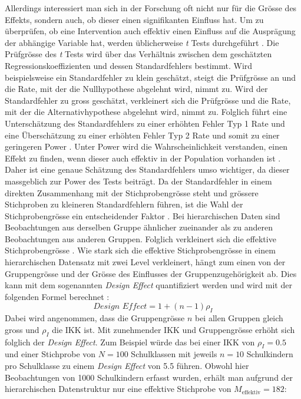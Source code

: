 \documentclass[12pt, a4paper]{article}\usepackage[]{graphicx}\usepackage[]{color}
\begin{document}
Allerdings interessiert man sich in der Forschung oft nicht nur für die Grösse des Effekts, sondern auch, ob dieser einen signifikanten Einfluss hat. Um zu überprüfen, ob eine Intervention auch effektiv einen Einfluss auf die Ausprägung der abhängige Variable hat, werden üblicherweise \textit{t} Tests durchgeführt \citep{SnijdersTomA.B2012Ma:a}. Die Prüfgrösse des \textit{t} Tests wird über das Verhältnis zwischen dem geschätzten Regressionskoeffizienten und dessen Standardfehlers bestimmt. Wird beispielsweise ein Standardfehler zu klein geschätzt, steigt die Prüfgrösse an und die Rate, mit der die Nullhypothese abgelehnt wird, nimmt zu. Wird der Standardfehler zu gross geschätzt, verkleinert sich die Prüfgrösse und die Rate, mit der die Alternativhypothese abgelehnt wird, nimmt zu. Folglich führt eine Unterschätzung des Standardfehlers zu einer erhöhten Fehler Typ 1 Rate und eine Überschätzung zu einer erhöhten Fehler Typ 2 Rate und somit zu einer geringeren Power \citep{SnijdersTomA.B2012Ma:a}. Unter Power wird die Wahrscheinlichkeit verstanden, einen Effekt zu finden, wenn dieser auch effektiv in der Population vorhanden ist \citep{scherbaumferreter2009powersample}. Daher ist eine genaue Schätzung des Standardfehlers umso wichtiger, da dieser massgeblich zur Power des Tests beiträgt. Da der Standardfehler in einem direkten Zusammenhang mit der Stichprobengrösse steht und grössere Stichproben zu kleineren Standardfehlern führen, ist die Wahl der Stichprobengrösse ein entscheidender Faktor \citep{james2013introduction, SnijdersTomA.B2012Ma:a}. Bei hierarchischen Daten sind Beobachtungen aus derselben Gruppe ähnlicher zueinander als zu anderen Beobachtungen aus anderen Gruppen. Folglich verkleinert sich die effektive Stichprobengrösse \citep{raudenbush2002hierarchical}. Wie stark sich die effektive Stichprobengrösse in einem hierarchischen Datensatz mit zwei Level verkleinert, hängt zum einen von der Gruppengrösse und der Grösse des Einflusses der Gruppenzugehörigkeit ab. Dies kann mit dem sogenannten \textit{Design Effect} quantifiziert werden und wird mit der folgenden Formel berechnet \citep{raudenbush2002hierarchical,SnijdersTomA.B2012Ma:a}:
\begin{equation}
\textit{Design Effect} = 1 + (n - 1) \rho_I
\end{equation}
Dabei wird angenommen, dass die Gruppengrösse $n$ bei allen Gruppen gleich gross und $\rho_I$ die IKK ist. Mit zunehmender IKK und Gruppengrösse erhöht sich folglich der \textit{Design Effect}. Zum Beispiel würde das bei einer IKK von $\rho_I = 0.5$ und einer Stichprobe von $N = 100$ Schulklassen mit jeweils $n = 10$ Schulkindern pro Schulklasse zu einem \textit{Design Effect} von 5.5 führen. Obwohl hier Beobachtungen von 1000 Schulkindern erfasst wurden, erhält man aufgrund der hierarchischen Datenstruktur nur eine effektive Stichprobe von $M_{\text{effektiv}} = 182$:
\end{document}
